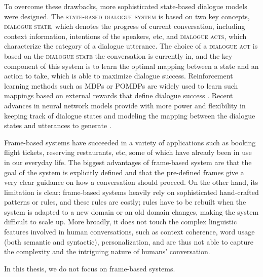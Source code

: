To overcome these drawbacks, 
 more sophisticated state-based dialogue models \cite{nagata1994first,reithinger1996predicting,warnke1997integrated,stolcke2000dialogue,allen2001architecture} were designed. 
The \textsc{state-based dialogue system} is based on two key concepts, \textsc{dialogue state}, 
which denotes the progress of current conversation, including context information, intentions of the speakers, etc, 
and \textsc{dialogue acts}, which characterize the category of a dialogue utterance. 
The choice of a \textsc{dialogue act} is based on the \textsc{dialogue state} the conversation is currently in, and the key component of this system is to 
learn the optimal mapping between a state and an action to take, which is able  to maximize dialogue success.  
Reinforcement learning methods 
such as MDPs or POMDPs are widely used 
to learn such mappings based on external rewards that define dialogue success 
\cite{young2000probabilistic,young2002statistical,lemon2006isu,williams2007partially,young2010hidden,young2013pomdp}.
Recent advances in neural network models provide with more power and flexibility in keeping track of dialogue states and 
 modeling the mapping between the dialogue states and utterances to generate  \cite{wen2015semantically,mrkvsic2015multi,su2015learning,wen2016network,wen2016conditional,su2016continuously,su2016line,wen2017latent}. 

Frame-based systems have succeeded in a variety of applications such as booking flight tickets, reserving restaurants, etc, some of which have already been 
in use in our everyday life.  
The biggest advantages of frame-based system are that 
the goal of the system is explicitly defined and that the pre-defined frames give a very clear guidance on how a conversation should proceed.
On the other hand, its limitation is  clear:
 frame-based systems heavily rely on sophisticated  hand-crafted patterns or rules, and these rules are costly;
 rules have to be rebuilt when the system is adapted to a new domain or an old domain changes, making the system difficult to scale up. 
More broadly, 
it does not touch  the complex linguistic features involved in human conversations, such as context coherence, 
word usage (both semantic and syntactic), 
personalization, 
and  
are thus not able to capture the complexity and the intriguing nature of humans'
conversation. 

In this thesis, we do not focus on frame-based systems.

